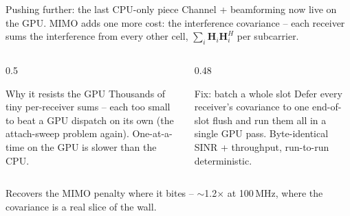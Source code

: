\documentclass[aspectratio=169,11pt]{beamer}
\begin{document}
\begin{frame}{Pushing further: the last CPU-only piece}
  Channel + beamforming now live on the GPU. \alert{MIMO adds one more cost}:
  the \alert{interference covariance} -- each receiver sums the interference from
  every other cell, $\sum_i \mathbf{H}_i\mathbf{H}_i^{H}$ per subcarrier.
  \vspace{0.5em}
  \begin{columns}[T]
  \begin{column}{0.5\textwidth}
    \begin{block}{Why it resists the GPU}
      Thousands of \alert{tiny} per-receiver sums -- each too small to beat a GPU
      dispatch on its own (the attach-sweep problem again). One-at-a-time on the
      GPU is \alert{slower} than the CPU.
    \end{block}
  \end{column}
  \begin{column}{0.48\textwidth}
    \begin{block}{Fix: batch a whole slot}
      Defer every receiver's covariance to one \alert{end-of-slot flush} and run
      them \alert{all in a single GPU pass}. \alert{Byte-identical} SINR +
      throughput, run-to-run deterministic.
    \end{block}
  \end{column}
  \end{columns}
  \vspace{0.3em}
  {\small Recovers the MIMO penalty where it bites -- \alert{$\sim$1.2$\times$} at
  100\,MHz, where the covariance is a real slice of the wall.}
\end{frame}
\end{document}
